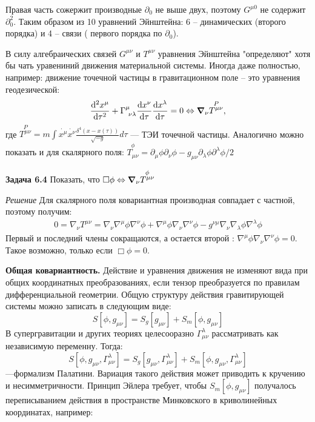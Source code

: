 \documentclass[a4paper]{article}
\begin{document}
Правая часть сожержит производные $\partial_0$ не выше двух, поэтому $G^{\mu 0} $ не содержит $\partial^2_0$. Таким образом из 10 уравнений Эйнштейна: 6 -- динамических (второго порядка) и 4 -- связи ( первого порядка по $\partial_0$).
\par 
В силу алгебраических связей $G^{\mu \nu}$ и $T^{\mu \nu} $ уравнения Эйнштейна "определяют" хотя бы чать уравениний движения материальной системы.  Иногда даже полностью, например: движение точечной частицы в гравитационном поле -- это уравнения геодезической:
\begin{equation}
\dv[2]{x^\mu}{\tau} + \Gamma^\mu_{{~}\nu \lambda} \dv{x^\nu}{\tau}\dv{x^\lambda}{\tau} = 0 \Leftrightarrow \grad_\nu \overset{P}{T^{\mu \nu}},
\end{equation}
где $\overset{P}{T^{\mu \nu}}= m\int \dot{x^\mu} \dot{x^\nu} \frac{\delta^4(x-x(\tau))}{\sqrt{-g}} d\tau $ --- ТЭИ точечной частицы.  Аналогично можно показать и для скалярного поля: $\overset{\phi}{T_{\mu \nu}} = \partial_\mu \phi \partial_\nu \phi - g_{\mu \nu} \partial_\lambda \phi \partial^\lambda \phi / 2$
\par
\textbf{Задача 6.4}  Показать, что $\Box \phi \Leftrightarrow \grad_\nu \overset{\phi}{T^{\mu \nu}}$
\par 
\textit{Решение} Для скалярного поля ковариантная производная совпадает с частной, поэтому получим:
\begin{align}
0 = \nabla_\nu T^{\mu \nu} = \nabla_\nu \nabla^\mu \phi \nabla^\nu \phi + \nabla^\mu \phi \nabla_\nu  \nabla^\nu \phi - g^{\nu \mu} \nabla_\nu \nabla_\lambda \phi \nabla^\lambda \phi
\end{align}
Первый и последний члены сокращаются, а остается второй : $\nabla^\mu \phi \nabla_\nu  \nabla^\nu \phi = 0$. Такое возможно, только если $\Box\phi = 0$.
\par
\textbf{Общая ковариантность.} Действие и уравнения движения не изменяют вида при общих координатных преобразованиях, если тензор преобразуется по правилам дифференциальной геометрии. Общую структуру действия гравитирующей системы можно записать в следующим виде:
\begin{equation}
S[ \phi, g_{\mu \nu}] = S_g[g_{\mu \nu}] + S_m [ \phi, g_{\mu \nu}]
\end{equation}
В супергравитации и других теориях  целесооразно $\Gamma_{\mu \nu}^{\lambda}$ рассматривать как независимую переменну.
Тогда:
\begin{equation}
S[ \phi, g_{\mu \nu}, \Gamma_{\mu \nu}^{\lambda}] = S_g[g_{\mu \nu}, \Gamma_{\mu \nu}^{\lambda}] + S_m [ \phi, g_{\mu \nu}, \Gamma_{\mu \nu}^{\lambda}]
\end{equation} ---формализм Палатини. Вариация такого действия может приводить к кручению и несимметричности. Принцип Эйлера требует, чтобы $S_m [ \phi, g_{\mu \nu}]$  получалось переписыванием действия в пространстве Минковского в криволинейных координатах, например: 
\end{document}
